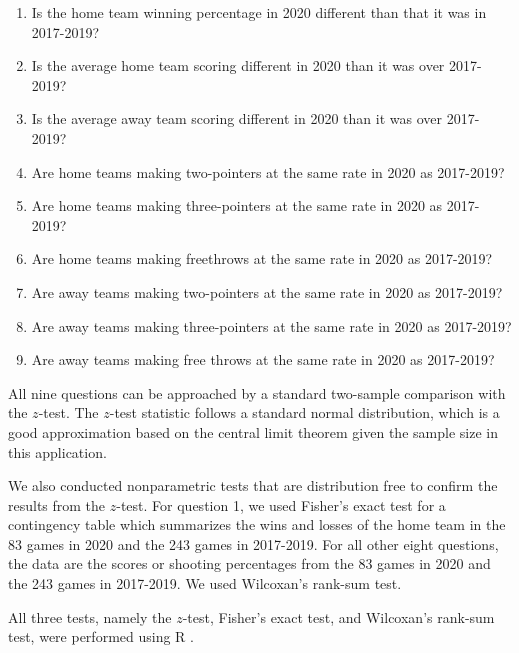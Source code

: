 \documentclass[10pt]{article}
\begin{document}
\begin{enumerate}
\def\labelenumi{\arabic{enumi}.}
\item
  Is the home team winning percentage in 2020 different than that it was in 2017-2019?
\item
  Is the average home team scoring different in 2020 than it was over 2017-2019?
\item
  Is the average away team scoring different in 2020 than it was over 2017-2019?
\item
  Are home teams making two-pointers at the same rate in 2020 as 2017-2019?
\item
  Are home teams making three-pointers at the same rate in 2020 as 2017-2019?
\item
  Are home teams making freethrows at the same rate in 2020 as 2017-2019?
\item
  Are away teams making two-pointers at the same rate in 2020 as 2017-2019?
\item
  Are away teams making three-pointers at the same rate in 2020 as 2017-2019?
\item
  Are away teams making free throws at the same rate in 2020 as 2017-2019?
\end{enumerate}

All nine questions can be approached by a standard two-sample
comparison with the \(z\)-test. The \(z\)-test statistic follows a
standard normal distribution, which is a good approximation based on
the central limit theorem given the sample size in this application.

We also conducted nonparametric tests that are distribution free to
confirm the results from the \(z\)-test. For question 1, we used
Fisher's exact test for a contingency table which summarizes the wins
and losses of the home team in the 83 games in 2020 and the 243 games
in 2017-2019. For all other eight questions, the data are the scores
or shooting percentages from the 83 games in 2020 and the 243 games in
2017-2019. We used Wilcoxan's rank-sum test.

All three tests, namely the \(z\)-test, Fisher's exact test, and
Wilcoxan's rank-sum test, were performed using R \citep{R}.
\end{document}
